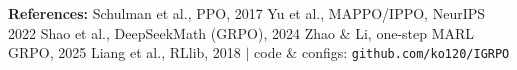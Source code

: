 \documentclass[final]{beamer}
\newcommand{\dsep}{\;\raisebox{0.45ex}{$\scriptstyle\bullet$}\;}
\begin{document}
\begin{frame}[t]
\begin{minipage}[t]{0.312\textwidth}
\end{minipage}

\vspace{0.1cm}
\begin{center}
{\small\color{black!55}
\textbf{References:} Schulman et al., PPO, 2017 \dsep
Yu et al., MAPPO/IPPO, NeurIPS 2022 \dsep
Shao et al., DeepSeekMath (GRPO), 2024 \dsep
Zhao \& Li, one-step MARL GRPO, 2025 \dsep
Liang et al., RLlib, 2018
\qquad\textcolor{black!30}{$\vert$}\qquad
code \& configs: \texttt{github.com/ko120/IGRPO}}
\end{center}

\end{frame}
\end{document}
